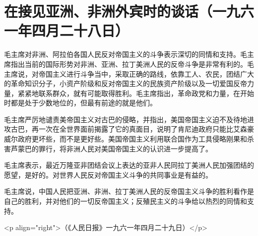 \section{在接见亚洲、非洲外宾时的谈话（一九六一年四月二十八日）}


毛主席对非洲、阿拉伯各国人民反对帝国主义的斗争表示深切的同情和支持。毛主席指出当前的国际形势对非洲、亚洲、拉丁美洲人民的反帝斗争是非常有利的。毛主席说，对帝国主义进行斗争当中，采取正确的路线，依靠工人、农民，团结广大的革命知识分子，小资产阶级和反对帝国主义的民族资产阶级以及一切爱国反帝力量，紧紧地联系群众，就有可能取得胜利。毛主席指出，革命政党和力量，在开始时都是处于少数地位的，但最有前途的就是他们。

毛主席严厉地谴责美帝国主义对古巴的侵略，并指出，美国帝国主义迫不及待地进攻古巴，再一次在全世界面前揭露了它的真面目，说明了肯尼迪政府只能比艾森豪威尔政府更坏些，而不是更好些。美国帝国主义利用联合国作为工具侵略刚果和杀害芦蒙巴的罪行，将非洲人民对美国帝国主义的认识进一步提高了。

毛主席表示，最近万隆亚非团结会议上表达的亚非人民同拉丁美洲人民加强团结的愿望，是好的。对世界人民反对帝国主义斗争的共同事业是有益的。

毛主席说，中国人民把亚洲、非洲、拉丁美洲人民的反帝国主义斗争的胜利看作是自己的胜利，并对他们的一切反帝国主义；反殖民主义的斗争给以热烈的同情和支持。

<p align="right">（《人民日报》一九六一年四月二十九日）</p>


